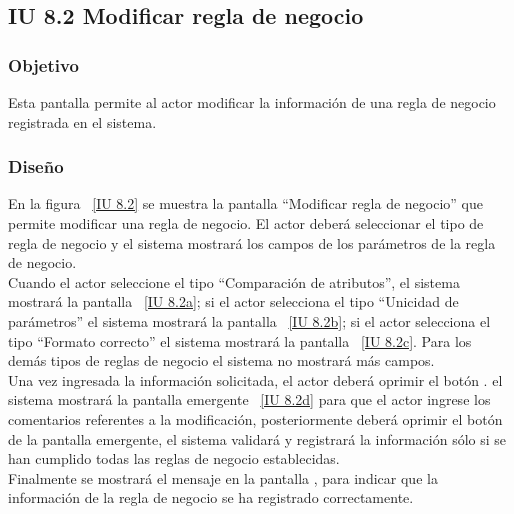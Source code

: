 \subsection{IU 8.2 Modificar regla de negocio}

\subsubsection{Objetivo}
	
	Esta pantalla permite al actor modificar la información de una regla de negocio registrada en el sistema.

\subsubsection{Diseño}

    En la figura ~\ref{IU 8.2} se muestra la pantalla ``Modificar regla de negocio'' que permite modificar una regla de negocio. El actor deberá 
    seleccionar el tipo de regla de negocio y el sistema mostrará los campos de los parámetros de la regla de negocio. \\
    
    Cuando el actor seleccione el tipo ``Comparación de atributos'', el sistema mostrará la pantalla ~\ref{IU 8.2a}; si el actor selecciona el tipo
    ``Unicidad de parámetros'' el sistema mostrará la pantalla ~\ref{IU 8.2b}; si el actor selecciona el tipo ``Formato correcto'' el sistema
    mostrará la pantalla ~\ref{IU 8.2c}. Para los demás tipos de reglas de negocio el sistema no mostrará más campos.\\
    
    Una vez ingresada la información solicitada, el actor deberá oprimir el botón . el sistema mostrará la pantalla emergente ~\ref{IU 8.2d} para que 
    el actor ingrese los comentarios referentes a la modificación, posteriormente deberá oprimir el botón  de la pantalla emergente, 
    el sistema validará y registrará la información sólo si se han cumplido todas las reglas de negocio establecidas.  \\
    
    Finalmente se mostrará el mensaje  en la pantalla , 
    para indicar que la información de la regla de negocio
    se ha registrado correctamente.        


